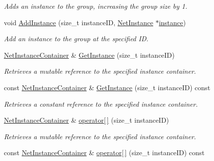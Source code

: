 \begin{DoxyCompactItemize}
\begin{DoxyCompactList}\small\item\em Adds an instance to the group, increasing the group size by 1. \item\end{DoxyCompactList}\item 
void \hyperlink{class_net_instance_group_ae1c55ab978d800606054738d35df0e77}{AddInstance} (size\_\-t instanceID, \hyperlink{class_net_instance}{NetInstance} $\ast$\hyperlink{class_net_instance_group_ac5074081fe0e0838a90288cdeebe8eaf}{instance})
\begin{DoxyCompactList}\small\item\em Add an instance to the group at the specified ID. \item\end{DoxyCompactList}\item 
\hyperlink{class_net_instance_container}{NetInstanceContainer} \& \hyperlink{class_net_instance_group_a049bd9d986e404931a22216173dec79b}{GetInstance} (size\_\-t instanceID)
\begin{DoxyCompactList}\small\item\em Retrieves a mutable reference to the specified instance container. \item\end{DoxyCompactList}\item 
const \hyperlink{class_net_instance_container}{NetInstanceContainer} \& \hyperlink{class_net_instance_group_ae123266a38b869d50eae8c2d7608bf34}{GetInstance} (size\_\-t instanceID) const 
\begin{DoxyCompactList}\small\item\em Retrieves a constant reference to the specified instance container. \item\end{DoxyCompactList}\item 
\hyperlink{class_net_instance_container}{NetInstanceContainer} \& \hyperlink{class_net_instance_group_a3a35db5047dfc303aa66e7793bb16fd2}{operator\mbox{[}$\,$\mbox{]}} (size\_\-t instanceID)
\begin{DoxyCompactList}\small\item\em Retrieves a mutable reference to the specified instance container. \item\end{DoxyCompactList}\item 
const \hyperlink{class_net_instance_container}{NetInstanceContainer} \& \hyperlink{class_net_instance_group_ad586325d2a8ad308b40f30606c68ca60}{operator\mbox{[}$\,$\mbox{]}} (size\_\-t instanceID) const 

\end{DoxyCompactItemize}
